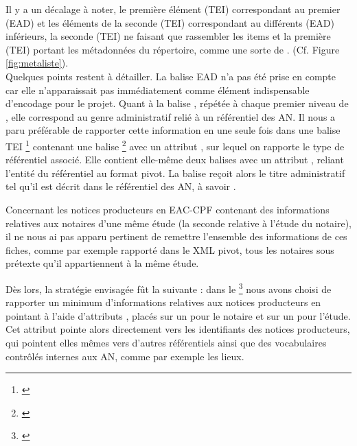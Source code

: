 Il y a un décalage à noter, le première élément  (TEI) correspondant au premier  (EAD) et les éléments  de la seconde  (TEI) correspondant au différents  (EAD) inférieurs, la seconde  (TEI) ne faisant que rassembler les items et la première  (TEI) portant les métadonnées du répertoire, comme une sorte de . (Cf. Figure \ref{fig:metaliste}).\\

Quelques points restent à détailler. La balise EAD  n'a pas été prise en compte car elle n'apparaissait pas immédiatement comme élément indispensable d'encodage pour le projet. Quant à la balise , répétée à chaque premier niveau de , elle correspond au genre administratif relié à un référentiel des AN. Il nous a paru préférable de rapporter cette information en une seule fois dans une balise TEI \footnote{\cite{tei_tei_nodate-19}} contenant une balise \footnote{\cite{tei_tei_nodate-18}} avec un attribut , sur lequel on rapporte le type de référentiel associé. Elle contient elle-même deux balises  avec un attribut , reliant l'entité du référentiel au format pivot. La balise reçoit alors le titre administratif tel qu'il est décrit dans le référentiel des AN, à savoir .

Concernant les notices producteurs en EAC-CPF contenant des informations relatives aux notaires d'une même étude (la seconde relative à l'étude du notaire), il ne nous ai pas apparu pertinent de remettre l'ensemble des informations de ces fiches, comme par exemple rapporté dans le XML pivot, tous les notaires sous prétexte qu'il appartiennent à la même étude. 

Dès lors, la stratégie envisagée fût la suivante : dans le \footnote{\cite{tei_tei_nodate-17}} nous avons choisi de rapporter un minimum d'informations relatives aux notices producteurs en pointant à l'aide d'attributs , placés sur un  pour le notaire et sur un  pour l'étude. Cet attribut pointe alors directement vers les identifiants des notices producteurs, qui pointent elles mêmes vers d'autres référentiels ainsi que des vocabulaires contrôlés internes aux AN, comme par exemple les lieux.\\

